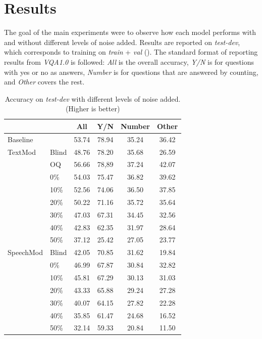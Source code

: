\documentclass[letterpaper]{article} %
\begin{document}
\section{Results}
The goal of the main experiments were to observe how each model performs with and without different levels of noise added. Results are reported on \textit{test-dev}, which corresponds to training on \textit{train} + \textit{val} (). The standard format of reporting results from \textit{VQA1.0} is followed: \textit{All} is the overall accuracy, \textit{Y/N} is for questions with yes or no as answers, \textit{Number} is for questions that are answered by counting, and \textit{Other} covers the rest.


\begin{table}[t]
\centering
\caption{Accuracy on \textit{test-dev} with different levels of noise added. (Higher is better)}
\label{table:vqa test-dev}
\begin{tabular}{ll|cccc}
          &                     & All    & Y/N    & Number & Other \\ \hline
Baseline  &                     & 53.74  & 78.94  & 35.24  & 36.42 \\ \hline
TextMod   & Blind               & 48.76  & 78.20  & 35.68  & 26.59 \\
          & OQ                  & 56.66  & 78,89  & 37.24  & 42.07 \\
          & 0\%                 & 54.03  & 75.47  & 36.82  & 39.62 \\
          & 10\%                & 52.56  & 74.06  & 36.50  & 37.85 \\
          & 20\%                & 50.22  & 71.16  & 35.72  & 35.64 \\
          & 30\%                & 47.03  & 67.31  & 34.45  & 32.56 \\
          & 40\%                & 42.83  & 62.35  & 31.97  & 28.64 \\
          & 50\%                & 37.12  & 25.42  & 27.05  & 23.77 \\ \hline
SpeechMod & Blind               & 42.05  & 70.85  & 31.62  & 19.84 \\ 
          & 0\%                 & 46.99  & 67.87  & 30.84  & 32.82 \\
          & 10\%                & 45.81  & 67.29  & 30.13  & 31.03 \\
          & 20\%                & 43.33  & 65.88  & 29.24  & 27.28 \\
          & 30\%                & 40.07  & 64.15  & 27.82  & 22.28 \\
          & 40\%                & 35.85  & 61.47  & 24.68  & 16.52 \\
          & 50\%                & 32.14  & 59.33  & 20.84  & 11.50 
\end{tabular}
\end{table}
\end{document}
